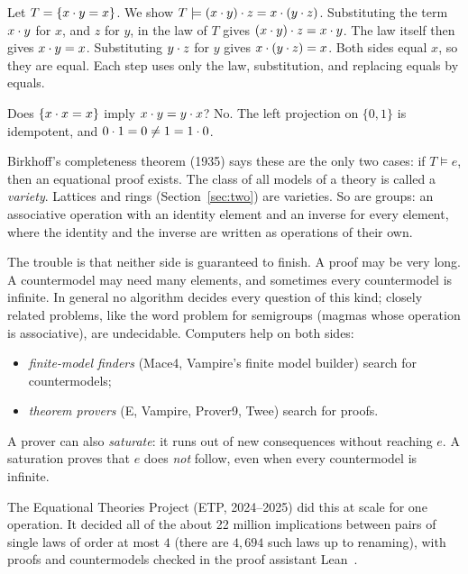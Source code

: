 \documentclass[11pt,a4paper]{article}
\begin{document}
\begin{example}
Let $T=\{x\cdot y=x\}$. We show $T\models(x\cdot y)\cdot z=x\cdot(y\cdot z)$. Substituting the term $x\cdot y$ for $x$, and $z$ for
$y$, in the law of $T$ gives $(x\cdot y)\cdot z=x\cdot y$. The law itself then gives $x\cdot y=x$. Substituting $y\cdot z$ for $y$
gives $x\cdot(y\cdot z)=x$. Both sides equal $x$, so they are equal. Each step uses only the law, substitution, and
replacing equals by equals.
\end{example}

\begin{example}[a countermodel]
Does $\{x\cdot x=x\}$ imply $x\cdot y=y\cdot x$? No. The left projection on $\{0,1\}$ is idempotent, and $0\cdot1=0\neq1=1\cdot0$.
\end{example}

Birkhoff's completeness theorem (1935) says these are the only two cases: if $T\models e$, then an equational proof
exists. The class of all models of a theory is called a \emph{variety}. Lattices and rings (Section~\ref{sec:two})
are varieties. So are groups: an associative operation with an identity element and an inverse for every element,
where the identity and the inverse are written as operations of their own.

The trouble is that neither side is guaranteed to finish. A proof may be very long. A countermodel may need many
elements, and sometimes every countermodel is infinite. In general no algorithm decides every question of this
kind; closely related problems, like the word problem for semigroups (magmas whose operation is associative), are
undecidable. Computers help on both
sides:
\begin{itemize}
\item \emph{finite-model finders} (Mace4, Vampire's finite model builder) search for countermodels;
\item \emph{theorem provers} (E, Vampire, Prover9, Twee) search for proofs.
\end{itemize}
A prover can also \emph{saturate}: it runs out of new consequences without reaching $e$. A saturation proves that $e$
does \emph{not} follow, even when every countermodel is infinite.

The Equational Theories Project (ETP, 2024--2025) did this at scale for one operation. It decided all of the about
22 million implications between pairs of single laws of order at most $4$ (there are $4{,}694$ such laws up to
renaming), with proofs and countermodels checked in the proof assistant Lean~\cite{etp}.
\end{document}
